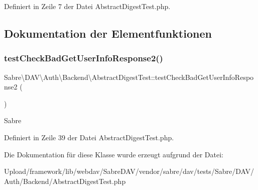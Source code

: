 Definiert in Zeile 7 der Datei Abstract\+Digest\+Test.\+php.



\subsection{Dokumentation der Elementfunktionen}
\mbox{\label{class_sabre_1_1_d_a_v_1_1_auth_1_1_backend_1_1_abstract_digest_test_afbd4574f741500b90146b69a141a47c6}} 
\subsubsection{\texorpdfstring{test\+Check\+Bad\+Get\+User\+Info\+Response2()}{testCheckBadGetUserInfoResponse2()}}
{\footnotesize\ttfamily Sabre\textbackslash{}\+D\+A\+V\textbackslash{}\+Auth\textbackslash{}\+Backend\textbackslash{}\+Abstract\+Digest\+Test\+::test\+Check\+Bad\+Get\+User\+Info\+Response2 (\begin{DoxyParamCaption}{ }\end{DoxyParamCaption})}

Sabre 

Definiert in Zeile 39 der Datei Abstract\+Digest\+Test.\+php.



Die Dokumentation für diese Klasse wurde erzeugt aufgrund der Datei\+:\begin{DoxyCompactItemize}
\item 
Upload/framework/lib/webdav/\+Sabre\+D\+A\+V/vendor/sabre/dav/tests/\+Sabre/\+D\+A\+V/\+Auth/\+Backend/Abstract\+Digest\+Test.\+php\end{DoxyCompactItemize}
